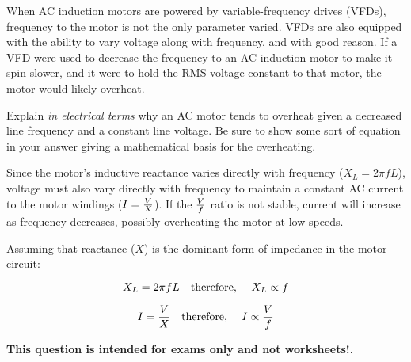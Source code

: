 

When AC induction motors are powered by variable-frequency drives (VFDs), frequency to the motor is not the only parameter varied.  VFDs are also equipped with the ability to vary voltage along with frequency, and with good reason.  If a VFD were used to decrease the frequency to an AC induction motor to make it spin slower, and it were to hold the RMS voltage constant to that motor, the motor would likely overheat.

Explain {\it in electrical terms} why an AC motor tends to overheat given a decreased line frequency and a constant line voltage.  Be sure to show some sort of equation in your answer giving a mathematical basis for the overheating.







Since the motor's inductive reactance varies directly with frequency ($X_L = 2 \pi f L$), voltage must also vary directly with frequency to maintain a constant AC current to the motor windings ($I = {V \over X}$).  If the $V \over f$ ratio is not stable, current will increase as frequency decreases, possibly overheating the motor at low speeds.

Assuming that reactance ($X$) is the dominant form of impedance in the motor circuit:

$$X_L = 2 \pi f L \hbox{\hskip 10pt therefore, \hskip 10pt} X_L \propto f$$

$$I = {V \over X} \hbox{\hskip 10pt therefore, \hskip 10pt} I \propto {V \over f}$$







{\bf This question is intended for exams only and not worksheets!}.




